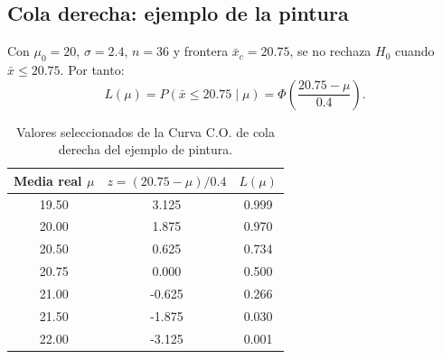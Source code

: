 \documentclass[11pt,a4paper]{article}
\begin{document}
\subsection{Cola derecha: ejemplo de la pintura}

Con $\mu_0=20$, $\sigma=2.4$, $n=36$ y frontera $\bar{x}_c=20.75$, se no rechaza $H_0$ cuando $\bar{x}\le20.75$. Por tanto:
\[
L(\mu)=P(\bar{x}\le20.75\mid\mu)
      =\Phi\!\left(\frac{20.75-\mu}{0.4}\right).
\]

\begin{table}[H]
\centering
\begin{tabular}{ccc}
\toprule
Media real $\mu$ & $z=(20.75-\mu)/0.4$ & $L(\mu)$\\
\midrule
19.50 & 3.125 & 0.999 \\
20.00 & 1.875 & 0.970 \\
20.50 & 0.625 & 0.734 \\
20.75 & 0.000 & 0.500 \\
21.00 & -0.625 & 0.266 \\
21.50 & -1.875 & 0.030 \\
22.00 & -3.125 & 0.001 \\
\bottomrule
\end{tabular}
\caption{Valores seleccionados de la Curva C.O. de cola derecha del ejemplo de pintura.}
\end{table}
\end{document}
